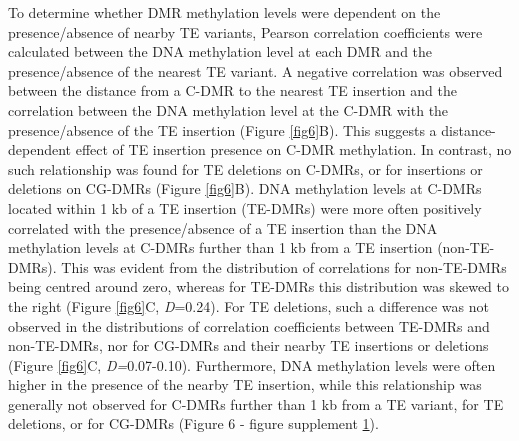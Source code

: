 \documentclass[12pt]{article}
\begin{document}
To determine whether DMR methylation levels were dependent on the
presence/absence of nearby TE variants, Pearson correlation
coefficients were calculated between the DNA methylation level at each
DMR and the presence/absence of the nearest TE variant. A negative
correlation was observed between the distance from a C-DMR to the
nearest TE insertion and the correlation between the DNA methylation
level at the C-DMR with the presence/absence of the TE insertion
(Figure \ref{fig6}B). This suggests a distance-dependent effect of TE
insertion presence on C-DMR methylation.  In contrast, no such
relationship was found for TE deletions on C-DMRs, or for insertions
or deletions on CG-DMRs (Figure \ref{fig6}B). DNA methylation levels
at C-DMRs located within 1 kb of a TE insertion (TE-DMRs) were more
often positively correlated with the presence/absence of a TE
insertion than the DNA methylation levels at C-DMRs further than 1 kb
from a TE insertion (non-TE-DMRs). This was evident from the
distribution of correlations for non-TE-DMRs being centred around
zero, whereas for TE-DMRs this distribution was skewed to the right
(Figure \ref{fig6}C, \emph{D}=0.24). For TE deletions, such a
difference was not observed in the distributions of correlation
coefficients between TE-DMRs and non-TE-DMRs, nor for CG-DMRs and
their nearby TE insertions or deletions (Figure \ref{fig6}C,
\emph{D=}0.07-0.10). Furthermore, DNA methylation levels were often
higher in the presence of the nearby TE insertion, while this
relationship was generally not observed for C-DMRs further than 1 kb
from a TE variant, for TE deletions, or for CG-DMRs (Figure 6 - figure
supplement \hyperref[fig6s1]{1}).
\end{document}
